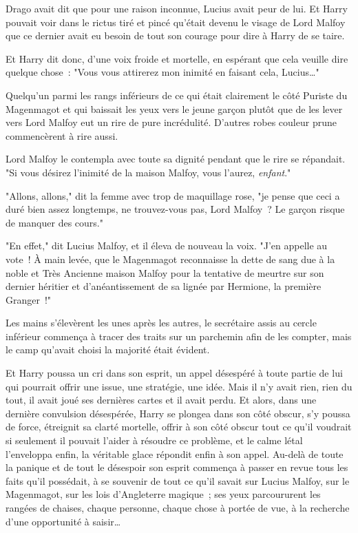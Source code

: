 Drago avait dit que pour une raison inconnue, Lucius avait peur de lui. Et Harry pouvait voir dans le rictus tiré et pincé qu'était devenu le visage de Lord Malfoy que ce dernier avait eu besoin de tout son courage pour dire à Harry de se taire.

Et Harry dit donc, d'une voix froide et mortelle, en espérant que cela veuille dire quelque chose~: "Vous vous attirerez mon inimité en faisant cela, Lucius…"

Quelqu'un parmi les rangs inférieurs de ce qui était clairement le côté Puriste du Magenmagot et qui baissait les yeux vers le jeune garçon plutôt que de les lever vers Lord Malfoy eut un rire de pure incrédulité. D'autres robes couleur prune commencèrent à rire aussi.

Lord Malfoy le contempla avec toute sa dignité pendant que le rire se répandait. "Si vous désirez l'inimité de la maison Malfoy, vous l'aurez, \emph{enfant}."

"Allons, allons," dit la femme avec trop de maquillage rose, "je pense que ceci a duré bien assez longtemps, ne trouvez-vous pas, Lord Malfoy~? Le garçon risque de manquer des cours."

"En effet," dit Lucius Malfoy, et il éleva de nouveau la voix. "J'en appelle au vote~! À main levée, que le Magenmagot reconnaisse la dette de sang due à la noble et Très Ancienne maison Malfoy pour la tentative de meurtre sur son dernier héritier et d'anéantissement de sa lignée par Hermione, la première Granger~!"

Les mains s'élevèrent les unes après les autres, le secrétaire assis au cercle inférieur commença à tracer des traits sur un parchemin afin de les compter, mais le camp qu'avait choisi la majorité était évident.

Et Harry poussa un cri dans son esprit, un appel désespéré à toute partie de lui qui pourrait offrir une issue, une stratégie, une idée. Mais il n'y avait rien, rien du tout, il avait joué ses dernières cartes et il avait perdu. Et alors, dans une dernière convulsion désespérée, Harry se plongea dans son côté obscur, s'y poussa de force, étreignit sa clarté mortelle, offrir à son côté obscur tout ce qu'il voudrait si seulement il pouvait l'aider à résoudre ce problème, et le calme létal l'enveloppa enfin, la véritable glace répondit enfin à son appel. Au-delà de toute la panique et de tout le désespoir son esprit commença à passer en revue tous les faits qu'il possédait, à se souvenir de tout ce qu'il savait sur Lucius Malfoy, sur le Magenmagot, sur les lois d'Angleterre magique~; ses yeux parcoururent les rangées de chaises, chaque personne, chaque chose à portée de vue, à la recherche d'une opportunité à saisir… 

